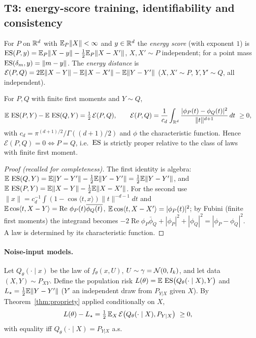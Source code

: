 \subsection{T3: energy-score training, identifiability and consistency}\label{sec:t3}

For $P$ on $\mathbb{R}^d$ with $\mathbb{E}_P\|X\|<\infty$ and $y\in\mathbb{R}^d$ the \emph{energy score} (with exponent $1$) is
$\operatorname{ES}(P,y)=\mathbb{E}_P\|X-y\|-\tfrac12\mathbb{E}_P\|X-X'\|$, $X,X'\sim P$ independent; for a point mass $\operatorname{ES}(\delta_m,y)=\|m-y\|$.
The \emph{energy distance} is $\mathcal E(P,Q)=2\mathbb{E}\|X-Y\|-\mathbb{E}\|X-X'\|-\mathbb{E}\|Y-Y'\|$ ($X,X'\sim P$, $Y,Y'\sim Q$, all independent).

\begin{theorem}\label{thm:propriety}
For $P,Q$ with finite first moments and $Y\sim Q$,
\[
\EE\,\ES(P,Y)-\EE\,\ES(Q,Y)=\tfrac12\,\mathcal E(P,Q),\qquad
\mathcal E(P,Q)=\frac1{c_d}\int_{\RR^d}\frac{|\phi_P(t)-\phi_Q(t)|^2}{\|t\|^{d+1}}\,dt\ \ge0,
\]
with $c_d=\pi^{(d+1)/2}/\Gamma((d+1)/2)$ and $\phi$ the characteristic function. Hence $\mathcal E(P,Q)=0\iff P=Q$, i.e.\ $\operatorname{ES}$ is strictly proper relative to the class of laws with finite first moment.
\end{theorem}
\begin{proof}[Proof (recalled for completeness)]
The first identity is algebra: $\mathbb{E}\,\operatorname{ES}(Q,Y)=\mathbb{E}\|Y-Y'\|-\tfrac12\mathbb{E}\|Y-Y'\|=\tfrac12\mathbb{E}\|Y-Y'\|$, and $\mathbb{E}\,\operatorname{ES}(P,Y)=\mathbb{E}\|X-Y\|-\tfrac12\mathbb{E}\|X-X'\|$.
For the second use $\|x\|=c_d^{-1}\int(1-\cos\langle t,x\rangle)\|t\|^{-d-1}dt$ \cite{szekely2013} and $\mathbb{E}\cos\langle t,X-Y\rangle=\operatorname{Re}\,\phi_P(t)\overline{\phi_Q(t)}$, $\mathbb{E}\cos\langle t,X-X'\rangle=|\phi_P(t)|^2$; by Fubini (finite first moments) the integrand becomes $-2\operatorname{Re}\phi_P\bar\phi_Q+|\phi_P|^2+|\phi_Q|^2=|\phi_P-\phi_Q|^2$. A law is determined by its characteristic function.
\end{proof}

\paragraph{Noise-input models.}
Let $Q_\theta(\cdot\mid x)$ be the law of $f_\theta(x,U)$, $U\sim\gamma=\mathcal{N}(0,I_k)$, and let data $(X,Y)\sim P_{XY}$.
Define the population risk $L(\theta)=\mathbb{E}\,\operatorname{ES}\bigl(Q_\theta(\cdot\mid X),Y\bigr)$ and $L_\star=\tfrac12\mathbb{E}\|Y-Y'\|$ ($Y'$ an independent draw from $P_{Y|X}$ given $X$).
By Theorem~\ref{thm:propriety} applied conditionally on $X$,
\begin{equation}\label{eq:risk}
L(\theta)-L_\star=\tfrac12\,\mathbb{E}_X\,\mathcal E\bigl(Q_\theta(\cdot\mid X),P_{Y|X}\bigr)\ \ge0,
\end{equation}
with equality iff $Q_\theta(\cdot\mid X)=P_{Y|X}$ a.s.


